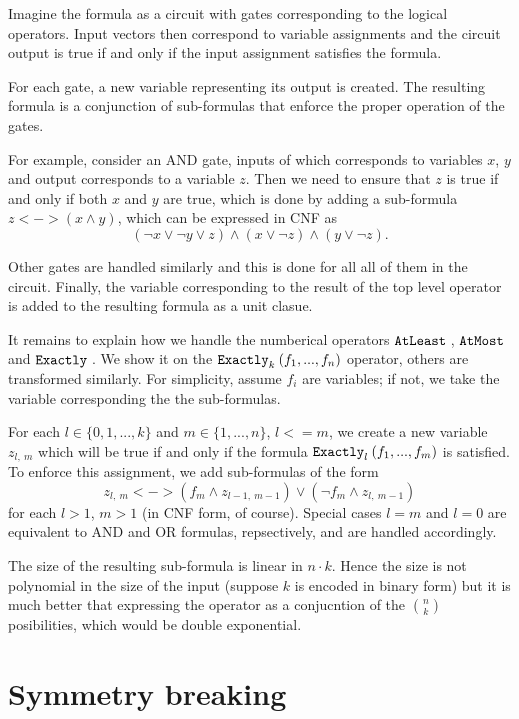 Imagine the formula as a circuit with gates corresponding to the logical operators.
Input vectors then correspond to variable assignments and the circuit output
  is true if and only if the input assignment satisfies the formula.

For each gate, a new variable representing its output is created.
The resulting formula is a conjunction of sub-formulas that enforce
  the proper operation of the gates.

For example, consider an AND gate, inputs of which corresponds to variables
  $x$, $y$ and output corresponds to a variable $z$.
Then we need to ensure that $z$ is true if and only if both $x$ and $y$ are true,
  which is done by adding a sub-formula $z <-> (x \wedge y)$, which can be
  expressed in CNF as
\[
(\neg x \vee \neg y \vee z) \wedge
(x \vee \neg z) \wedge
(y \vee \neg z).
\]

Other gates are handled similarly and this is done for all all of them in the circuit.
Finally, the variable
  corresponding to the result of the top level operator is added
  to the resulting formula as a unit clasue.

It remains to explain how we handle the numberical operators
  $\mathtt{AtLeast}_{}\:$, $\mathtt{AtMost}_{}\:$ and $\mathtt{Exactly}_{}\:$.
We show it on the $\mathtt{Exactly}_{k}\:(f_1, ..., f_n)$ operator,
  others are transformed similarly. For simplicity,
  assume $f_i$ are variables; if not, we take the variable corresponding the
  the sub-formulas.

For each $l\in\{0,1,...,k\}$ and $m\in\{1,...,n\}$, $l <= m$, we create
  a new variable $z_{l,\:m}$ which will be true if and only if
  the formula $\mathtt{Exactly}_{l}\:(f_1, ..., f_m)$ is satisfied.
To enforce this assignment, we add sub-formulas of the form
  \[ z_{l,\:m} <-> (f_m \wedge z_{l-1,\:m-1}) \vee (\neg f_m \wedge z_{l,\:m-1}) \]
  for each $l > 1$, $m > 1$ (in CNF form, of course).
Special cases $l = m$ and $l = 0$ are equivalent to AND and OR formulas, repsectively,
  and are handled accordingly.

The size of the resulting sub-formula is linear in $n\cdot k$.
Hence the size is not polynomial in the size of the input
  (suppose $k$ is encoded in binary form) but it is much better
  that expressing the operator as a conjucntion of the $n\choose k$ posibilities,
  which would be double exponential.

\section{Symmetry breaking}

